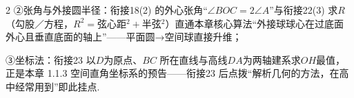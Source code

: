 \documentclass[fontset=none]{ctexart}
\begin{document}
\begin{multicols}{2}
\bindp ②张角与外接圆半径：衔接18(2) 的外心张角“\(\angle BOC=2\angle A\)”与衔接22(3) 求\(R\)（勾股／方程，\(R^{2}=\)弦心距\({}^{2}+\)半弦\({}^{2}\)）直通本章核心算法“外接球球心在过底面外心且垂直底面的轴上”——平面圆→空间球直接升维；

\bindp ③坐标法：衔接23 以\(D\)为原点、\(BC\) 所在直线与高线\(DA\)为两轴建系求\(OH\)最值，正是本章 1.1.3 空间直角坐标系的预告——衔接23 后点拨“解析几何的方法，在高中经常用到”即此挂点.\par\addvspace{0.80mm}

\end{multicols}

\tailfill
\end{document}
